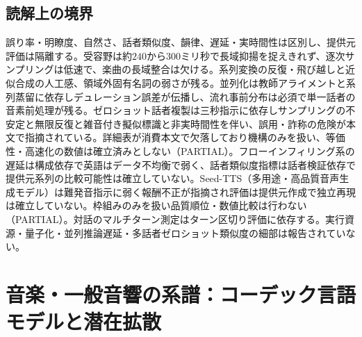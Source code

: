 \documentclass[lualatex,a4paper,10pt]{jlreq}
\begin{document}
\subsection*{読解上の境界}
誤り率・明瞭度、自然さ、話者類似度、韻律、遅延・実時間性は区別し、提供元評価は隔離する\autocite{btd051,btd057,btd058,btd061,btd062}。受容野は約$240$から$300$ミリ秒で長域抑揚を捉えきれず、逐次サンプリングは低速で、楽曲の長域整合は欠ける\autocite{btd051}。系列変換の反復・飛び越しと近似合成の人工感、領域外固有名詞の弱さが残る\autocite{btd052,btd053}。並列化は教師アライメントと系列蒸留に依存しデュレーション誤差が伝播し、流れ事前分布は必須で単一話者の音素前処理が残る\autocite{btd054,btd056}。ゼロショット話者複製は三秒指示に依存しサンプリングの不安定と無限反復と雑音付き擬似標識と非実時間性を伴い、誤用・詐称の危険が本文で指摘されている\autocite{btd058}。詳細表が消費本文で欠落しており機構のみを扱い、等価性・高速化の数値は確立済みとしない（PARTIAL）\autocite{btd059}。フローインフィリング系の遅延は構成依存で英語はデータ不均衡で弱く、話者類似度指標は話者検証依存で提供元系列の比較可能性は確立していない\autocite{btd132,btd133}。Seed-TTS（多用途・高品質音声生成モデル）は難発音指示に弱く報酬不正が指摘され評価は提供元作成で独立再現は確立していない\autocite{btd061}。枠組みのみを扱い品質順位・数値比較は行わない（PARTIAL）。対話のマルチターン測定はターン区切り評価に依存する\autocite{btd134}。実行資源・量子化・並列推論遅延・多話者ゼロショット類似度の細部は報告されていない\autocite{btd054,btd055,btd056}。

\section{音楽・一般音響の系譜：コーデック言語モデルと潜在拡散}\label{sec:music}
\end{document}
